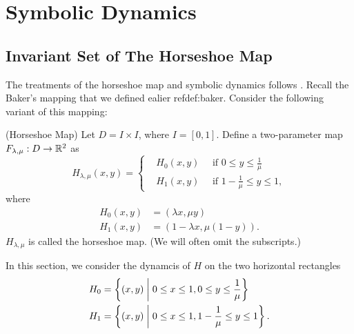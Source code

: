\documentclass[12pt,twoside]{book}
\begin{document}
\chapter{Symbolic Dynamics}

\section{Invariant Set of The Horseshoe Map}
The treatments of the horseshoe map and symbolic dynamics follows \citet{wiggins}.
Recall the Baker's mapping that we defined ealier ref{def:baker}.
Consider the following variant of this mapping:
\begin{definition}
  (Horseshoe Map)
  Let $D = I \times I$, where $I = [0,1]$.
  Define a two-parameter map $F_{\lambda, \mu}: D \to \mathbb{R}^2$ as
  \begin{equation*}
    H_{\lambda, \mu}(x,y) =
    \begin{cases}
      &H_0(x,y) \quad\mbox{ if } 0 \leq y \leq \frac{1}{\mu}   \\
      &H_1(x,y) \quad\mbox{ if } 1 - \frac{1}{\mu} \leq y \leq 1,
    \end{cases}
  \end{equation*}
  where
  \begin{align*}
    H_0(x,y) &= (\lambda x, \mu y)  \\
    H_1(x,y) &= (1 - \lambda x, \mu(1 - y)).
  \end{align*}
  $H_{\lambda, \mu}$ is called the horseshoe map.
  (We will often omit the subscripts.)
\end{definition}
In this section, we consider the dynamcis of $H$ on the two horizontal rectangles 
\begin{align*}
  H_0 &= \left \{ (x,y) \mathrel{} \middle| \mathrel{}  0 \leq x \leq 1, 0 \leq y \leq \frac{1}{\mu} \right \}  \\
  H_1 &= \left \{ (x,y) \mathrel{} \middle| \mathrel{}  0 \leq x \leq 1, 1 - \frac{1}{\mu} \leq y \leq 1 \right \}.
\end{align*}
\end{document}
